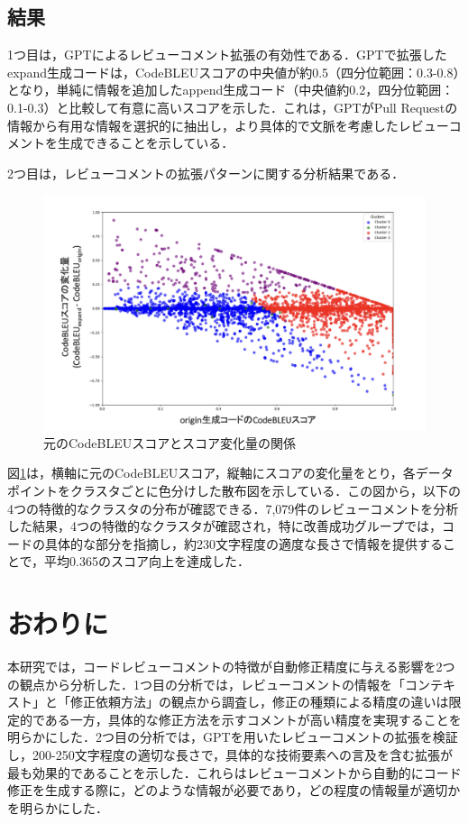 \documentclass[twocolumn]{jarticle} %
\begin{document}
\subsection{結果}
1つ目は，GPTによるレビューコメント拡張の有効性である．GPTで拡張したexpand生成コードは，CodeBLEUスコアの中央値が約0.5（四分位範囲：0.3-0.8）となり，単純に情報を追加したappend生成コード（中央値約0.2，四分位範囲：0.1-0.3）と比較して有意に高いスコアを示した．これは，GPTがPull Requestの情報から有用な情報を選択的に抽出し，より具体的で文脈を考慮したレビューコメントを生成できることを示している．

2つ目は，レビューコメントの拡張パターンに関する分析結果である．

\begin{figure}[htbp]
\centering
\includegraphics[width=0.9\linewidth]{@BSthesis2024_Akamatsu/Akamatsu_figs/rq2_result02_02.png}
\caption{元のCodeBLEUスコアとスコア変化量の関係}
\label{fig:scatter-cluster}
\end{figure}

図\ref{fig:scatter-cluster}は，横軸に元のCodeBLEUスコア，縦軸にスコアの変化量をとり，各データポイントをクラスタごとに色分けした散布図を示している．この図から，以下の4つの特徴的なクラスタの分布が確認できる．7,079件のレビューコメントを分析した結果，4つの特徴的なクラスタが確認され，特に改善成功グループでは，コードの具体的な部分を指摘し，約230文字程度の適度な長さで情報を提供することで，平均0.365のスコア向上を達成した．

\section{おわりに}

本研究では，コードレビューコメントの特徴が自動修正精度に与える影響を2つの観点から分析した．1つ目の分析では，レビューコメントの情報を「コンテキスト」と「修正依頼方法」の観点から調査し，修正の種類による精度の違いは限定的である一方，具体的な修正方法を示すコメントが高い精度を実現することを明らかにした．2つ目の分析では，GPTを用いたレビューコメントの拡張を検証し，200-250文字程度の適切な長さで，具体的な技術要素への言及を含む拡張が最も効果的であることを示した．これらはレビューコメントから自動的にコード修正を生成する際に，どのような情報が必要であり，どの程度の情報量が適切かを明らかにした．










\end{document}

